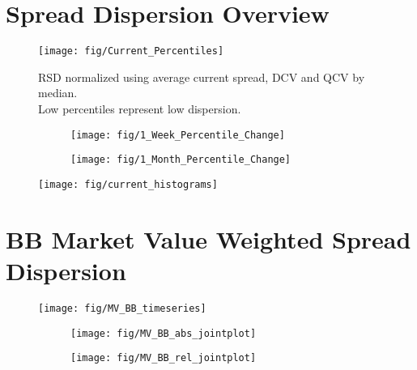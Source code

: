 \documentclass[12pt]{article}
\begin{document}
\section{Spread Dispersion Overview}
\begin{figure}[H]
	\centering
	\texttt{[image: fig/Current\_Percentiles]}
	\caption{RSD normalized using average current spread, DCV and QCV by median.\\ Low percentiles represent low dispersion.}
\end{figure}

\begin{figure}[H]
	\begin{subfigure}[t]{0.48\textwidth}
		\centering
		\texttt{[image: fig/1\_Week\_Percentile\_Change]}
	\end{subfigure}
	\hfill
	\begin{subfigure}[t]{0.48\textwidth}
		\centering
		\texttt{[image: fig/1\_Month\_Percentile\_Change]}
	\end{subfigure}
\end{figure}
\vfill
\begin{figure}[H]
	\centering
	\texttt{[image: fig/current\_histograms]}
\end{figure}
\vfill
\pagebreak


\section{BB Market Value Weighted Spread Dispersion}
\begin{figure}[H]
	\centering
	\texttt{[image: fig/MV\_BB\_timeseries]}
\end{figure}
\begin{figure}[H]
	\begin{subfigure}[t]{0.48\textwidth}
		\centering
		\texttt{[image: fig/MV\_BB\_abs\_jointplot]}
	\end{subfigure}
	\hfill
	\begin{subfigure}[t]{0.48\textwidth}
		\centering
		\texttt{[image: fig/MV\_BB\_rel\_jointplot]}
	\end{subfigure}
\end{figure}
\pagebreak
\end{document}
